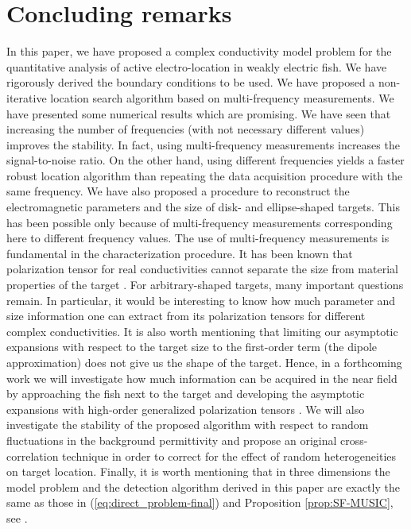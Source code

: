 \documentclass[final]{siamltex}
\numberwithin{equation}{section}
\numberwithin{figure}{section}
\numberwithin{table}{section}
\begin{document}
\section{Concluding remarks}

In this paper, we have proposed a complex conductivity model
problem for the quantitative analysis of active electro-location
in weakly electric fish. We have rigorously derived the boundary
conditions to be used. We have proposed a non-iterative location
search algorithm based on multi-frequency measurements.  We have
presented some numerical results which are promising. We have seen
that increasing the number of frequencies (with not necessary
different values) improves the stability. In fact, using
multi-frequency measurements increases the signal-to-noise ratio.
On the other hand, using different frequencies yields a faster
robust location algorithm than repeating the data acquisition
procedure with the same frequency. We have also proposed a
procedure to reconstruct the electromagnetic parameters and the
size of disk- and ellipse-shaped targets. This has been possible
only because of multi-frequency measurements corresponding here to
different frequency values. The use of multi-frequency
measurements is fundamental in the characterization procedure. It
has been known that polarization tensor for real conductivities
cannot separate the size from material properties of the target
\cite{ammari2007polarization}. For arbitrary-shaped targets, many
important questions remain. In particular, it would be interesting
to know how much parameter and size information one can extract
from its polarization tensors for different complex
conductivities. It is also worth mentioning that limiting our
asymptotic expansions with respect to the target size to the
first-order term (the dipole approximation) does not give us the
shape of the target. Hence, in a forthcoming work we will
investigate how much information can be acquired in the near field
by approaching the fish next to the target and developing the
asymptotic expansions with high-order generalized polarization
tensors \cite{ammari2004reconstruction}. We will also investigate
the stability of the proposed algorithm with respect to random
fluctuations in the background permittivity and propose an
original cross-correlation technique in order to correct for the
effect of random heterogeneities on target location. Finally, it
is worth mentioning that in three dimensions the model problem and
the detection algorithm derived in this paper are exactly the same
as those in (\ref{eq:direct_problem-final}) and Proposition
\ref{prop:SF-MUSIC}, see \cite{ammari2004reconstruction,
khelifizribi}.
\end{document}
